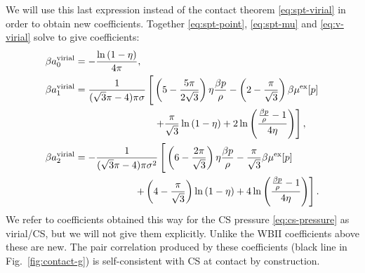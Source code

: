 \documentclass[11pt,twoside]{report}
\begin{document}
We will use this last expression instead of the contact theorem \eqref{eq:spt-virial} in order to obtain new coefficients.
Together \eqref{eq:spt-point}, \eqref{eq:spt-mu} and \eqref{eq:v-virial} solve to give coefficients:
\begin{subequations}\label{eq:virial-coefficients}
  \begin{align}
    \beta a_0^\mathrm{virial}
    &=
    -\frac{\ln{(1- \eta)}}{4\pi},
    \\
    \beta a_1^\mathrm{virial}
    &=
    \frac{1}{(\sqrt{3}\pi - 4)\pi\sigma}
    \left[
    \vphantom{\ln{\left( \frac{\frac{\beta p}{\rho} - 1 }{4\eta} \right)}}
    \left(5 - \frac{5\pi}{2\sqrt{3}}\right)
    \eta \frac{\beta p}{\rho}
    - \left( 2 - \frac{\pi}{\sqrt{3}} \right) \beta \mu^\mathrm{ex}[p]
    \right.
    \nonumber \\
    & \qquad \qquad \qquad \qquad
    \left.
    + \frac{\pi}{\sqrt{3}} \ln{(1 - \eta)}
    + 2 \ln{\left( \frac{\frac{\beta p}{\rho} - 1 }{4\eta} \right)}
    \right],
    \\
    \beta a_2^\mathrm{virial}
    &=
    - \frac{1}{(\sqrt{3}\pi - 4)\pi \sigma^2}
    \left[
    \vphantom{\ln{\left( \frac{\frac{\beta p}{\rho} - 1 }{4\eta} \right)}}
    \left(6 - \frac{2\pi}{\sqrt{3}}\right)
    \eta \frac{\beta p}{\rho}
    - \frac{\pi}{\sqrt{3}} \beta \mu^\mathrm{ex}[p]
    \right.
    \nonumber \\
    & \qquad \qquad \qquad
    \left.
    + \left( 4 - \frac{\pi}{\sqrt{3}} \right) \ln{(1 - \eta)}
    + 4 \ln{\left( \frac{\frac{\beta p}{\rho} - 1 }{4\eta} \right)}
    \right].
 \end{align}
\end{subequations}
We refer to coefficients obtained this way for the CS pressure \eqref{eq:cs-pressure} as virial/CS, but we will not give them explicitly.
Unlike the WBII coefficients above these are new.
The pair correlation produced by these coefficients (black line in Fig.\ \ref{fig:contact-g}) is self-consistent with CS at contact by construction.
\end{document}
